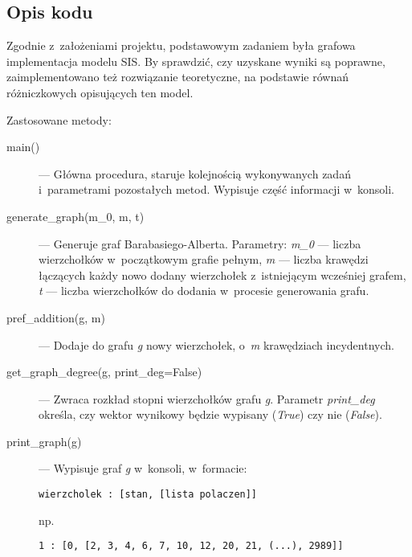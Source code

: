 \begin{enumerate}
\section{Opis kodu}
\label{sec:opis_kodu}

Zgodnie z~założeniami projektu, podstawowym zadaniem była grafowa implementacja modelu SIS. By sprawdzić, czy uzyskane wyniki są poprawne, zaimplementowano też rozwiązanie teoretyczne, na podstawie równań różniczkowych opisujących ten model. 

Zastosowane metody:
\begin{description}
\item[main()] --- Główna procedura, staruje kolejnością wykonywanych zadań i~parametrami pozostałych metod. Wypisuje część informacji w~konsoli.
\item[generate\_graph(m\_0, m, t)] --- Generuje graf Barabasiego-Alberta. Parametry: \emph{m\_0} --- liczba wierzchołków w~początkowym grafie pełnym, \emph{m} --- liczba krawędzi łączących każdy nowo dodany wierzchołek z~istniejącym wcześniej grafem, \emph{t} --- liczba wierzchołków do dodania w~procesie generowania grafu.
\item[pref\_addition(g, m)] --- Dodaje do grafu \emph{g} nowy wierzchołek, o~\emph{m} krawędziach incydentnych.
\item[get\_graph\_degree(g, print\_deg=False)] --- Zwraca rozkład stopni wierzchołków grafu \emph{g}. Parametr \emph{print\_deg} określa, czy wektor wynikowy będzie wypisany (\emph{True}) czy nie (\emph{False}).
\item[print\_graph(g)] --- Wypisuje graf \emph{g} w~konsoli, w~formacie:

\begin{lstlisting}[frame=single]
wierzcholek : [stan, [lista polaczen]]
\end{lstlisting}
np.
\begin{lstlisting}[frame=single]
1 : [0, [2, 3, 4, 6, 7, 10, 12, 20, 21, (...), 2989]]
\end{lstlisting}


\end{description}
\end{enumerate}
